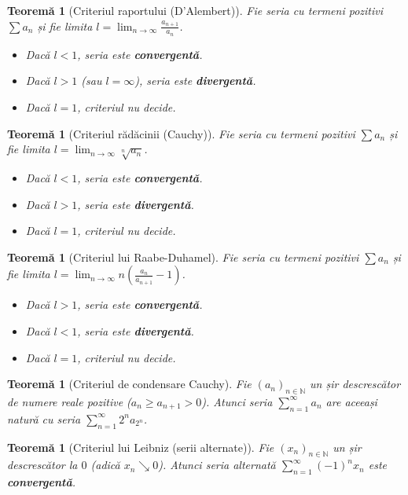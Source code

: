 \documentclass[11pt,a4paper]{article}
\theoremstyle{definition}
\theoremstyle{plain}
\newtheorem{theorem}[definition]{Teoremă}
\theoremstyle{remark}
\newcommand{\N}{\mathbb{N}}
\begin{document}
\begin{theorem}[Criteriul raportului (D'Alembert)]
    Fie seria cu termeni pozitivi $\sum a_n$ și fie limita $l = \lim_{n \to \infty} \frac{a_{n+1}}{a_n}$.
    \begin{itemize}
        \item Dacă $l < 1$, seria este \textbf{convergentă}.
        \item Dacă $l > 1$ (sau $l=\infty$), seria este \textbf{divergentă}.
        \item Dacă $l = 1$, criteriul nu decide.
    \end{itemize}
\end{theorem}

\begin{theorem}[Criteriul rădăcinii (Cauchy)]
    Fie seria cu termeni pozitivi $\sum a_n$ și fie limita $l = \lim_{n \to \infty} \sqrt[n]{a_n}$.
    \begin{itemize}
        \item Dacă $l < 1$, seria este \textbf{convergentă}.
        \item Dacă $l > 1$, seria este \textbf{divergentă}.
        \item Dacă $l = 1$, criteriul nu decide.
    \end{itemize}
\end{theorem}

\begin{theorem}[Criteriul lui Raabe-Duhamel]
    Fie seria cu termeni pozitivi $\sum a_n$ și fie limita $l = \lim_{n \to \infty} n \left( \frac{a_n}{a_{n+1}} - 1 \right)$.
    \begin{itemize}
        \item Dacă $l > 1$, seria este \textbf{convergentă}.
        \item Dacă $l < 1$, seria este \textbf{divergentă}.
        \item Dacă $l = 1$, criteriul nu decide.
    \end{itemize}
\end{theorem}

\begin{theorem}[Criteriul de condensare Cauchy]
    Fie $(a_n)_{n \in \N}$ un șir descrescător de numere reale pozitive ($a_n \ge a_{n+1} > 0$). Atunci seria $\sum_{n=1}^\infty a_n$ are aceeași natură cu seria $\sum_{n=1}^\infty 2^n a_{2^n}$.
\end{theorem}

\begin{theorem}[Criteriul lui Leibniz (serii alternate)]
    Fie $(x_n)_{n \in \N}$ un șir descrescător la $0$ (adică $x_n \searrow 0$). Atunci seria alternată $\sum_{n=1}^\infty (-1)^n x_n$ este \textbf{convergentă}.
\end{theorem}
\end{document}
